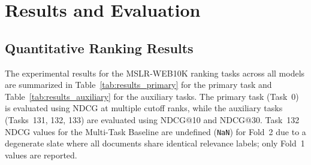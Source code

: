 \section{Results and Evaluation}

\subsection{Quantitative Ranking Results}

The experimental results for the MSLR-WEB10K ranking tasks across all models are summarized in Table~\ref{tab:results_primary} for the primary task and Table~\ref{tab:results_auxiliary} for the auxiliary tasks. The primary task (Task~0) is evaluated using NDCG at multiple cutoff ranks, while the auxiliary tasks (Tasks~131, 132, 133) are evaluated using NDCG@10 and NDCG@30. Task~132 NDCG values for the Multi-Task Baseline are undefined (\texttt{NaN}) for Fold~2 due to a degenerate slate where all documents share identical relevance labels; only Fold~1 values are reported.

